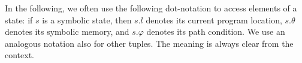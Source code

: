 \documentclass{sig-alternate}%
\newcommand{\prm}[1]{\ensuremath{\llbracket #1 \rrbracket}}
\newcommand{\bld}[1]{\ensuremath{\boldsymbol{#1}}}
\newcommand{\compose}{\ensuremath{\diamond}}
\begin{document}


In the following, we often use the following dot-notation to access elements
of a state: if $s$ is a symbolic state, then $s.l$ denotes its current
program location, $s.\theta$ denotes its symbolic memory, and $s.\varphi$
denotes its path condition. We use an analogous notation also for other
tuples. The meaning is always clear from the context.
\end{document}
